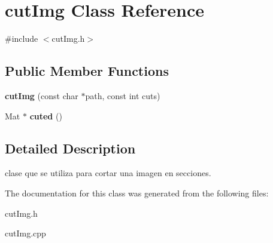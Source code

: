 \hypertarget{classcutImg}{}\section{cut\+Img Class Reference}
\label{classcutImg}


{\ttfamily \#include $<$cut\+Img.\+h$>$}

\subsection*{Public Member Functions}
\begin{DoxyCompactItemize}
\item 
\hypertarget{classcutImg_a2dd1123db00b7120fb5e12bd037292e7}{}{\bfseries cut\+Img} (const char $\ast$path, const int cuts)\label{classcutImg_a2dd1123db00b7120fb5e12bd037292e7}

\item 
\hypertarget{classcutImg_aadfff8737a2dfc453a75495ac450bd84}{}Mat $\ast$ {\bfseries cuted} ()\label{classcutImg_aadfff8737a2dfc453a75495ac450bd84}

\end{DoxyCompactItemize}


\subsection{Detailed Description}
clase que se utiliza para cortar una imagen en secciones. 

The documentation for this class was generated from the following files\+:\begin{DoxyCompactItemize}
\item 
cut\+Img.\+h\item 
cut\+Img.\+cpp\end{DoxyCompactItemize}

